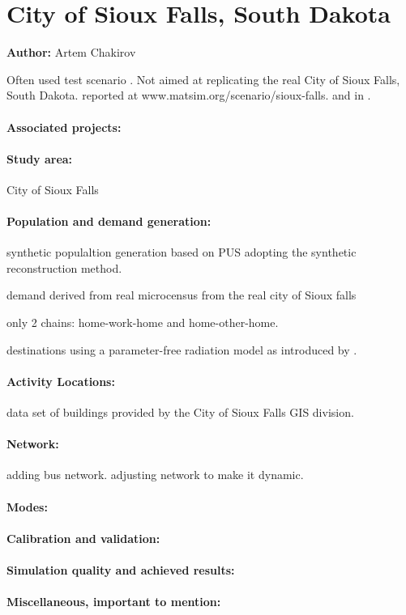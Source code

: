 \section{City of Sioux Falls, South Dakota}
\label{ch:scenarios:siouxfalls}
\hfill \textbf{Author:} Artem Chakirov

Often used test scenario \citep[][]{BarGera_TNTP_Webpage_2013}. Not aimed at replicating the real City of Sioux Falls, South Dakota.
reported at www.matsim.org/scenario/sioux-falls.
and in \citet[][]{ChakirovFourie_TechRep_FCL_2014}.


\paragraph{Associated projects:} 

\paragraph{Study area:} City of Sioux Falls

\paragraph{Population and demand generation:}
synthetic populaltion generation based on PUS adopting the synthetic reconstruction method.

demand
derived from real microcensus from the real city of Sioux falls

only 2 chains: home-work-home and home-other-home.

destinations using a parameter-free radiation model as introduced by \citet[][]{SiminiEtAl_NAT_2012}.

\paragraph{Activity Locations:} data set of buildings provided by the City of Sioux Falls GIS division.

\paragraph{Network:} adding bus network. adjusting network to make it dynamic.

\paragraph{Modes:}

\paragraph{Calibration and validation:}

\paragraph{Simulation quality and achieved results:}

\paragraph{Miscellaneous, important to mention:}

